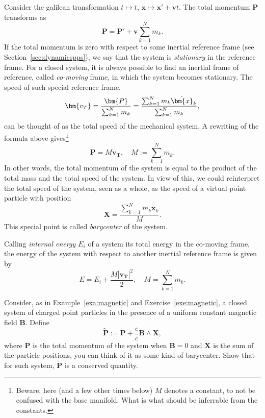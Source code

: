 \documentclass[english,fontsize=11pt,paper=a5,oneside]{scrbook}
\newcommand{\bx}{\bm{x}}
\theoremstyle{definition}
\newenvironment{example}
  {\pushQED{\qed}\renewcommand{\qedsymbol}{$\lozenge$}\examplex}
  {\popQED\endexamplex}
\newenvironment{exercise}
  {\pushQED{\qed}\renewcommand{\qedsymbol}{$\maltese$}\exercisex}
  {\popQED\endexercisex}
\begin{document}
\begin{example}[The baricenter]
  Consider the galilean transformation $t \mapsto t$, $\bx \mapsto \bx' + \bm{v}t$.
  The total momentum $\bm{P}$ transforms as
  \begin{equation}
    \bm{P} = \bm{P}' + \bm{v}  \sum_{k=1}^N m_k.
  \end{equation}
  If the total momentum is zero with respect to some inertial reference frame (see Section~\ref{sec:dynamicspps}), we say that the system is \emph{stationary} in the reference frame. For a closed system, it is always possible to find an inertial frame of reference, called \emph{co-moving} frame, in which the system becomes stationary. The speed of such special reference frame,
  \begin{equation}
    \bm{v_T} = \frac{\bm{P}}{\sum_{k=1}^N m_k}
    = \frac{\sum_{k=1}^N m_k \dot \bx_k}{\sum_{k=1}^N m_k},
  \end{equation}
  can be thought of as the total speed of the mechanical system.
  A rewriting of the formula above gives\footnote{Beware, here (and a few other times below) $M$ denotes a constant, to not be confused with the base manifold. What is what should be inferrable from the constants.}
  \begin{equation}
    \bm{P} = M \bm{v_T}, \quad M:= \sum_{k=1}^N m_k.
  \end{equation}
  In other words, the total momentum of the system is equal to the product of the total mass and the total speed of the system.
  In view of this, we could reinterpret the total speed of the system, seen as a whole, as the speed of a virtual point particle with position
  \begin{equation}
    \bm{X} = \frac{\sum_{k=1}^N m_k \bx_k}{M}.
  \end{equation}
  This special point is called \emph{barycenter} of the system.
  \medskip

  Calling \emph{internal energy $E_i$} of a system its total energy in the co-moving frame, the energy of the system with respect to another inertial reference frame is given by
  \begin{equation}
    E = E_i + \frac{M |\bm{v_T}|^2}{2}, \quad M= \sum_{k=1}^N m_k.
  \end{equation}
\end{example}

\begin{exercise}
  Consider, as in Example~\ref{exa:magnetic} and Exercise~\ref{exe:magnetic}, a closed system of charged point particles in the presence of a uniform constant magnetic field $\bm{B}$. Define
  \begin{equation}
    \widetilde{\bm{P}} := \bm{P} + \frac{e}c \bm{B}\wedge \bm{X},
  \end{equation}
  where $\bm{P}$ is the total momentum of the system when $\bm{B} = 0$ and $\bm{X}$ is the sum of the particle positions, you can think of it as some kind of barycenter.
  Show that for such system, $\widetilde{\bm{P}}$ is a conserved quantity.
\end{exercise}
\end{document}
